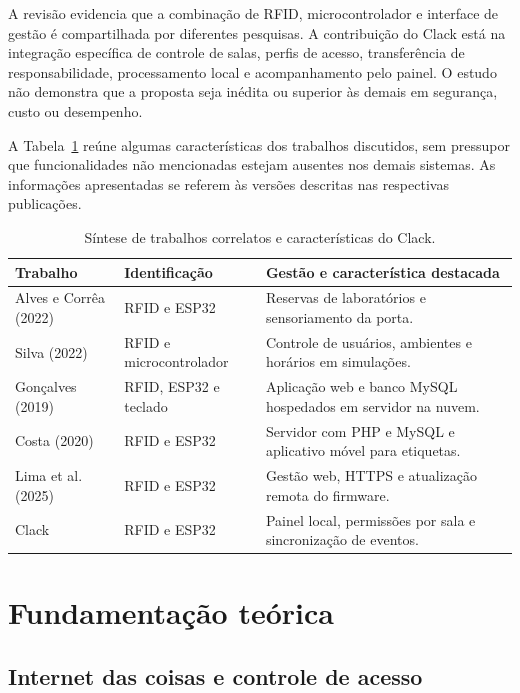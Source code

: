 \documentclass[12pt]{article}
\begin{document}
A revisão evidencia que a combinação de RFID, microcontrolador e interface de gestão é compartilhada por diferentes pesquisas. A contribuição do Clack está na integração específica de controle de salas, perfis de acesso, transferência de responsabilidade, processamento local e acompanhamento pelo painel. O estudo não demonstra que a proposta seja inédita ou superior às demais em segurança, custo ou desempenho.

A Tabela~\ref{tab:correlatos} reúne algumas características dos trabalhos discutidos, sem pressupor que funcionalidades não mencionadas estejam ausentes nos demais sistemas. As informações apresentadas se referem às versões descritas nas respectivas publicações.

\begin{table}[htbp]
  \centering
  \caption{Síntese de trabalhos correlatos e características do Clack.}
  \label{tab:correlatos}
  \small
  \renewcommand{\arraystretch}{1.15}
  \begin{tabular}{>{\raggedright\arraybackslash}p{3.2cm}>{\raggedright\arraybackslash}p{3.0cm}>{\raggedright\arraybackslash}p{6.1cm}}
    \toprule
    Trabalho & Identificação & Gestão e característica destacada \\
    \midrule
    Alves e Corrêa (2022) & RFID e ESP32 & Reservas de laboratórios e sensoriamento da porta. \\
    Silva (2022) & RFID e microcontrolador & Controle de usuários, ambientes e horários em simulações. \\
    Gonçalves (2019) & RFID, ESP32 e teclado & Aplicação web e banco MySQL hospedados em servidor na nuvem. \\
    Costa (2020) & RFID e ESP32 & Servidor com PHP e MySQL e aplicativo móvel para etiquetas. \\
    Lima et al. (2025) & RFID e ESP32 & Gestão web, HTTPS e atualização remota do firmware. \\
    Clack & RFID e ESP32 & Painel local, permissões por sala e sincronização de eventos. \\
    \bottomrule
  \end{tabular}
\end{table}

\section{Fundamentação teórica}

\subsection{Internet das coisas e controle de acesso}
\end{document}

